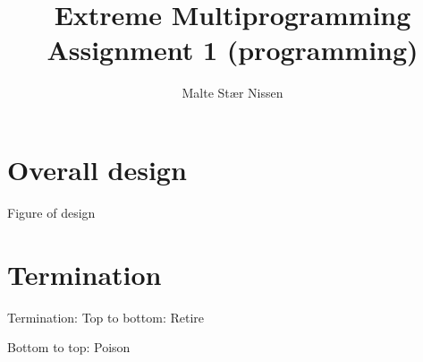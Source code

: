 \documentclass[11pt,a4paper]{article}
\title{Extreme Multiprogramming\\Assignment 1 (programming)}
\author{Malte Stær Nissen}
\begin{document}
\maketitle

\section{Overall design}
Figure of design

\section{Termination}
Termination: Top to bottom: Retire

Bottom to top: Poison


\clearpage

\inputminted[linenos,fontsize=\scriptsize]{python}{src/bean.py}
\end{document}
